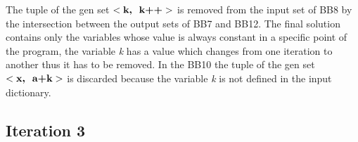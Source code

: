 \documentclass[a4paper,12pt,numbers=noenddot]{scrreprt}
\begin{document}
            The tuple of the gen set $<\textbf{k,\; k++}>$ is removed from the input set of BB8 by the intersection between the output sets of BB7 and BB12. The final solution contains only the variables whose value is always constant in a specific point of the program, the variable \textit{k} has a value which changes from one iteration to another thus it has to be removed.
            In the BB10 the tuple of the gen set $<\textbf{x,\; a+k}>$ is discarded because the variable \textit{k} is not defined in the input dictionary.
    
    \subsection*{Iteration 3}

        \vspace{0.1cm}
        
        \begin{table}[H]
            \centering
            \caption{Input-Output Table, Iteration 3}
            \label{tab:cp_input_output_table3}
        \end{table}
\end{document}
